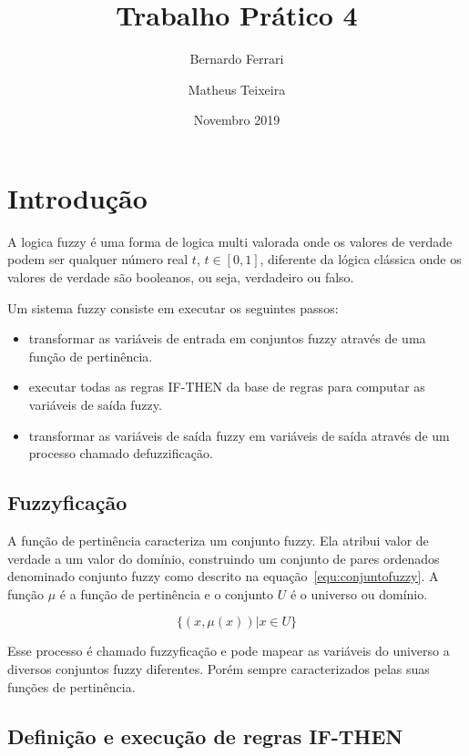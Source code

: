 \documentclass[12pt, a4paper]{article}
\title{Trabalho Prático 4}
\author{Bernardo Ferrari \and Matheus Teixeira}
\date{Novembro 2019}
\begin{document}
\maketitle

\section{Introdução}

A logica fuzzy é uma forma de logica multi valorada onde os valores de verdade podem ser qualquer número real $t$, $t \in [0, 1]$,
diferente da lógica clássica onde os valores de verdade são booleanos, ou seja, verdadeiro ou falso.

Um sistema fuzzy consiste em executar os seguintes passos:
\begin{itemize}
    \item transformar as variáveis de entrada em conjuntos fuzzy através de uma função de pertinência.
    \item executar todas as regras IF-THEN da base de regras para computar as variáveis de saída fuzzy.
    \item transformar as variáveis de saída fuzzy em variáveis de saída através de um processo chamado defuzzificação.
\end{itemize}

\subsection{Fuzzyficação}

A função de pertinência caracteriza um conjunto fuzzy.
Ela atribui valor de verdade a um valor do domínio, construindo um conjunto de pares ordenados denominado conjunto fuzzy como descrito na equação~\ref{equ:conjuntofuzzy}.
A função $\mu$ é a função de pertinência e o conjunto $U$ é o universo ou domínio.

\begin{equation}\label{equ:conjuntofuzzy}
  \{ (x, \mu(x)) | x \in U \}
\end{equation}

Esse processo é chamado fuzzyficação e pode mapear as variáveis do universo a diversos conjuntos fuzzy diferentes.
Porém sempre caracterizados pelas suas funções de pertinência.

\subsection{Definição e execução de regras IF-THEN}
\end{document}
